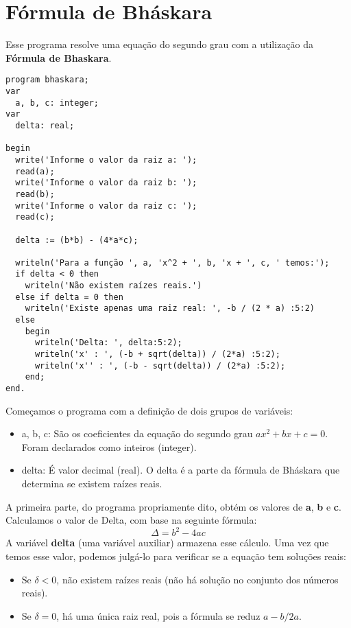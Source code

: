 \section{Fórmula de Bháskara}
Esse programa resolve uma equação do segundo grau com a utilização da \textbf{Fórmula de Bhaskara}.
\begin{lstlisting}[]
program bhaskara;
var
  a, b, c: integer;
var
  delta: real;

begin
  write('Informe o valor da raiz a: ');
  read(a);
  write('Informe o valor da raiz b: ');
  read(b);
  write('Informe o valor da raiz c: ');
  read(c);

  delta := (b*b) - (4*a*c);

  writeln('Para a função ', a, 'x^2 + ', b, 'x + ', c, ' temos:');
  if delta < 0 then
    writeln('Não existem raízes reais.')
  else if delta = 0 then
    writeln('Existe apenas uma raiz real: ', -b / (2 * a) :5:2)
  else
    begin
      writeln('Delta: ', delta:5:2);
      writeln('x' : ', (-b + sqrt(delta)) / (2*a) :5:2);
      writeln('x'' : ', (-b - sqrt(delta)) / (2*a) :5:2);
    end;
end.	
\end{lstlisting}

Começamos o programa com a definição de dois grupos de variáveis:  \vspace{-1em}
\begin{itemize}
	\item a, b, c: São os coeficientes da equação do segundo grau $ax^2 + bx + c = 0$. Foram declarados como inteiros (integer).
	\item delta: É valor decimal (real). O delta é a parte da fórmula de Bháskara que determina se existem raízes reais.
\end{itemize}

A primeira parte, do programa propriamente dito, obtém os valores de \textbf{a}, \textbf{b} e \textbf{c}. Calculamos o valor de Delta, com base na seguinte fórmula:
\[
\Delta = b^2 - 4ac
\]
A variável \textbf{delta} (uma variável auxiliar) armazena esse cálculo. Uma vez que temos esse valor, podemos julgá-lo para verificar se a equação tem soluções reais: \vspace{-1em}
\begin{itemize}
	\item Se $\delta < 0$, não existem raízes reais (não há solução no conjunto dos números reais).
	\item Se $\delta = 0$, há uma única raiz real, pois a fórmula se reduz $a - b / 2a$.
\end{itemize}

